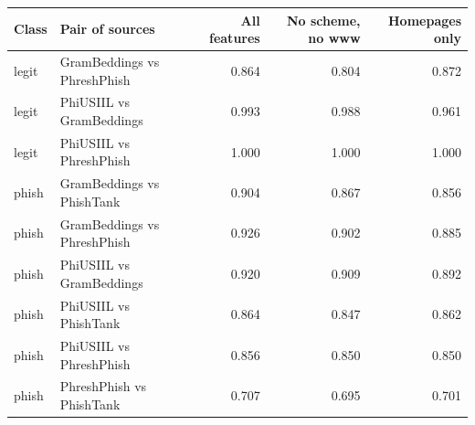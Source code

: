 {\footnotesize
\begin{tabular}{llrrr}
\toprule
\textbf{Class} & \textbf{Pair of sources} & \textbf{All features} & \textbf{No scheme, no www} & \textbf{Homepages only} \\
\midrule
legit & GramBeddings vs PhreshPhish & 0.864 & 0.804 & 0.872 \\
legit & PhiUSIIL vs GramBeddings & 0.993 & 0.988 & 0.961 \\
legit & PhiUSIIL vs PhreshPhish & 1.000 & 1.000 & 1.000 \\
phish & GramBeddings vs PhishTank & 0.904 & 0.867 & 0.856 \\
phish & GramBeddings vs PhreshPhish & 0.926 & 0.902 & 0.885 \\
phish & PhiUSIIL vs GramBeddings & 0.920 & 0.909 & 0.892 \\
phish & PhiUSIIL vs PhishTank & 0.864 & 0.847 & 0.862 \\
phish & PhiUSIIL vs PhreshPhish & 0.856 & 0.850 & 0.850 \\
phish & PhreshPhish vs PhishTank & 0.707 & 0.695 & 0.701 \\
\bottomrule
\end{tabular}
}
